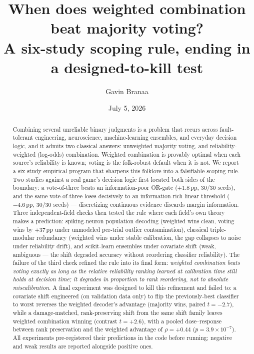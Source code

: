 \documentclass[aps,prapplied,preprint,amsmath,amssymb,floatfix]{revtex4-2}
\begin{document}
\title{When does weighted combination beat majority voting?\\
A six-study scoping rule, ending in a designed-to-kill test}

\author{Gavin Branaa}

\date{July 5, 2026}

\begin{abstract}
Combining several unreliable binary judgments is a problem that recurs
across fault-tolerant engineering, neuroscience, machine-learning
ensembles, and everyday decision logic, and it admits two classical
answers: unweighted majority voting, and reliability-weighted (log-odds)
combination. Weighted combination is provably optimal when each source's
reliability is known; voting is the folk-robust default when it is not.
We report a six-study empirical program that sharpens this folklore into
a falsifiable scoping rule. Two studies against a real game's decision
logic first located both sides of the boundary: a vote-of-three beats an
information-poor OR-gate ($+1.8$\,pp, 30/30 seeds), and the same
vote-of-three loses decisively to an information-rich linear threshold
($-4.6$\,pp, 30/30 seeds) --- discretizing continuous evidence discards
margin information. Three independent-field checks then tested the rule
where each field's own theory makes a prediction: spiking-neuron
population decoding (weighted wins clean, voting wins by $+37$\,pp under
unmodeled per-trial outlier contamination), classical triple-modular
redundancy (weighted wins under stable calibration, the gap collapses to
noise under reliability drift), and scikit-learn ensembles under covariate
shift (weak, ambiguous --- the shift degraded accuracy without reordering
classifier reliability). The failure of the third check refined the rule
into its final form: \emph{weighted combination beats voting exactly as
long as the relative reliability ranking learned at calibration time
still holds at decision time; it degrades in proportion to rank
reordering, not to absolute miscalibration}. A final experiment was
designed to kill this refinement and failed to: a covariate shift
engineered (on validation data only) to flip the previously-best
classifier to worst reverses the weighted decoder's advantage (majority
wins, paired $t=-2.7$), while a damage-matched, rank-preserving shift
from the same shift family leaves weighted combination winning (contrast
$t=+2.6$), with a pooled dose--response between rank preservation and the
weighted advantage of $\rho=+0.44$ ($p=3.9\times10^{-7}$). All
experiments pre-registered their predictions in the code before running;
negative and weak results are reported alongside positive ones.
\end{abstract}
\end{document}
